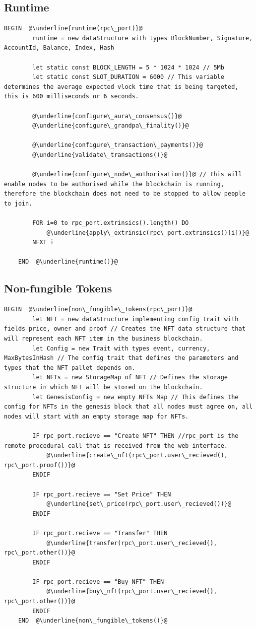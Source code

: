 \subsection{Runtime}
\begin{lstlisting}[caption=Runtime, escapechar=\@]
	BEGIN  @\underline{runtime(rpc\_port)}@
		runtime = new dataStructure with types BlockNumber, Signature, AccountId, Balance, Index, Hash

		let static const BLOCK_LENGTH = 5 * 1024 * 1024 // 5Mb
		let static const SLOT_DURATION = 6000 // This variable determines the average expected vlock time that is being targeted, this is 600 milliseconds or 6 seconds.

		@\underline{configure\_aura\_consensus()}@
		@\underline{configure\_grandpa\_finality()}@

		@\underline{configure\_transaction\_payments()}@
		@\underline{validate\_transactions()}@

		@\underline{configure\_node\_authorisation()}@ // This will enable nodes to be authorised while the blockchain is running, therefore the blockchain does not need to be stopped to allow people to join.

		FOR i=0 to rpc_port.extrinsics().length() DO
			@\underline{apply\_extrinsic(rpc\_port.extrinsics()[i])}@
		NEXT i

	END  @\underline{runtime()}@
\end{lstlisting}
\subsection{Non-fungible Tokens}
\begin{lstlisting}[caption=Non Fungible Tokens, escapechar=\@]
	BEGIN  @\underline{non\_fungible\_tokens(rpc\_port)}@
		let NFT = new dataStructure implementing config trait with fields price, owner and proof // Creates the NFT data structure that will represent each NFT item in the business blockchain.
		let Config = new Trait with types event, currency, MaxBytesInHash // The config trait that defines the parameters and types that the NFT pallet depends on.
		let NFTs = new StorageMap of NFT // Defines the storage structure in which NFT will be stored on the blockchain.
		let GenesisConfig = new empty NFTs Map // This defines the config for NFTs in the genesis block that all nodes must agree on, all nodes will start with an empty storage map for NFTs.
		
		IF rpc_port.recieve == "Create NFT" THEN //rpc_port is the remote procedural call that is received from the web interface.
			@\underline{create\_nft(rpc\_port.user\_recieved(), rpc\_port.proof())}@
		ENDIF

		IF rpc_port.recieve == "Set Price" THEN
			@\underline{set\_price(rpc\_port.user\_recieved())}@
		ENDIF

		IF rpc_port.recieve == "Transfer" THEN
			@\underline{transfer(rpc\_port.user\_recieved(), rpc\_port.other())}@
		ENDIF

		IF rpc_port.recieve == "Buy NFT" THEN
			@\underline{buy\_nft(rpc\_port.user\_recieved(), rpc\_port.other())}@
		ENDIF
	END  @\underline{non\_fungible\_tokens()}@
\end{lstlisting}

